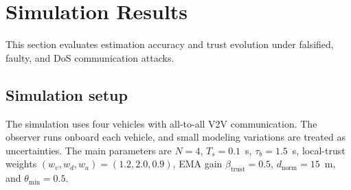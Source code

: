 \documentclass{ifacconf}
\begin{document}
\section{Simulation Results}\label{sec_simulation}
\vspace*{-0.3cm}

This section evaluates estimation accuracy and trust evolution under falsified, faulty, and DoS communication attacks.


 











\vspace*{-0.3cm}
\subsection {Simulation setup}
\vspace*{-0.3cm}

The simulation uses four vehicles with all-to-all V2V communication. The observer runs onboard each vehicle, and small modeling variations are treated as uncertainties. The main parameters are $N=4$, $T_s=0.1$~s, $\tau_b=1.5$~s, local-trust weights $(w_v,w_d,w_a)=(1.2,2.0,0.9)$, EMA gain $\beta_{\text{trust}}=0.5$, $d_{\text{norm}}=15$~m, and $\theta_{\min}=0.5$.
\end{document}
